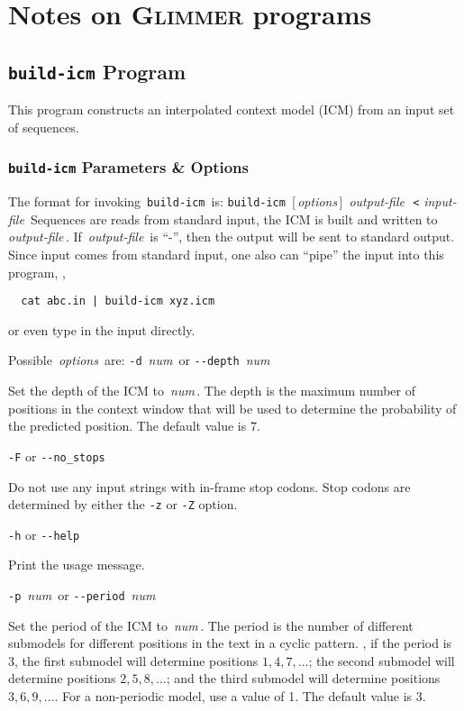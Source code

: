 \documentclass[fleqn,titlepage,11pt]{article}
\def\Desc#1{\,\mbox{\emph{#1}}\,}
\def\Glimmer{\textsc{Glimmer}}
\def\Pg#1{\texttt{#1}}
\begin{document}
\section{Notes on \Glimmer{} programs}

\subsection{\Pg{build-icm} Program}

This program constructs an interpolated context model (ICM)
from an input set of sequences.

\subsubsection{\Pg{build-icm} Parameters \& Options}
The format for invoking \,\Pg{build-icm}\, is:
\bq
  \Pg{build-icm}\, [\Desc{options}] \Desc{output-file} \,\Pg{<}\,\Desc{input-file}
\eq
Sequences are reads from standard input, the ICM is
built and written to \Desc{output-file}.  If \Desc{output-file}
is ``-'', then the output will be sent to standard output.
Since input comes from standard input, one also can ``pipe'' the input
into this program, \eg,
\BSV
\begin{verbatim}
  cat abc.in | build-icm xyz.icm
\end{verbatim}
\ESV
or even type in the input directly.

Possible \Desc{options} are:
\bl{}\RaggedRight
\exdent
  \verb`-d` \Desc{num} \enskip or \enskip \verb`--depth` \Desc{num}

  Set the depth of the ICM to \Desc{num}.  The depth is the
  maximum number of positions in the context window that
  will be used to determine the probability of the predicted
  position.  The default value is 7.

\exdent
  \verb`-F` \enskip or \enskip \verb`--no_stops`

  Do not use any input strings with in-frame stop codons.
  Stop codons are determined by either the \Pg{-z} or \Pg{-Z}
  option.

\exdent
  \verb`-h` \enskip or \enskip \verb`--help`

  Print the usage message.

\exdent
  \verb`-p` \Desc{num} \enskip or \enskip \verb`--period` \Desc{num}

  Set the period of the ICM to \Desc{num}.  The period is the
  number of different submodels for different positions in the
  text in a cyclic pattern.  \Eg, if the period is 3, the first
  submodel will determine positions $1, 4, 7, \dots$; the second
  submodel will determine positions $2, 5, 8, \dots$; and the third
  submodel will determine positions $3, 6, 9, \dots$.  For a
  non-periodic model, use a value of 1.  The default value
  is 3.
\end{document}
